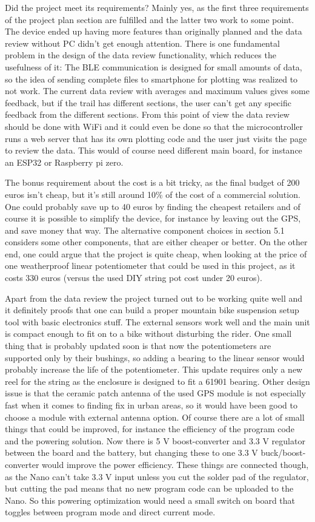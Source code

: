 \documentclass[a4paper,11pt]{article}
\begin{document}
Did the project meet its requirements? Mainly yes, as the first three requirements of the project plan section are fulfilled and the latter two work to some point. The device ended up having more features than originally planned and the data review without PC didn't get enough attention. There is one fundamental problem in the design of the data review functionality, which reduces the usefulness of it: The BLE communication is designed for small amounts of data, so the idea of sending complete files to smartphone for plotting was realized to not work. The current data review with averages and maximum values gives some feedback, but if the trail has different sections, the user can't get any specific feedback from the different sections. From this point of view the data review should be done with WiFi and it could even be done so that the microcontroller runs a web server that has its own plotting code and the user just visits the page to review the data. This would of course need different main board, for instance an ESP32 or Raspberry pi zero.

The bonus requirement about the cost is a bit tricky, as the final budget of 200 euros isn't cheap, but it's still around 10\% of the cost of a commercial solution. One could probably save up to 40 euros by finding the cheapest retailers and of course it is possible to simplify the device, for instance by leaving out the GPS, and save money that way. The alternative component choices in section 5.1 considers some other components, that are either cheaper or better. On the other end, one could argue that the project is quite cheap, when looking at the price of one weatherproof linear potentiometer that could be used in this project, as it costs 330 euros (versus the used DIY string pot cost under 20 euros).

Apart from the data review the project turned out to be working quite well and it definitely proofs that one can build a proper mountain bike suspension setup tool with basic electronics stuff. The external sensors work well and the main unit is compact enough to fit on to a bike without disturbing the rider. One small thing that is probably updated soon is that now the potentiometers are supported only by their bushings, so adding a bearing to the linear sensor would probably increase the life of the potentiometer. This update requires only a new reel for the string as the enclosure is designed to fit a 61901 bearing. Other design issue is that the ceramic patch antenna of the used GPS module is not especially fast when it comes to finding fix in urban areas, so it would have been good to choose a module with external antenna option. Of course there are a lot of small things that could be improved, for instance the efficiency of the program code and the powering solution. Now there is 5 V boost-converter and 3.3 V regulator between the board and the battery, but changing these to one 3.3 V buck/boost-converter would improve the power efficiency. These things are connected though, as the Nano can't take 3.3 V input unless you cut the solder pad of the regulator, but cutting the pad means that no new program code can be uploaded to the Nano. So this powering optimization would need a small switch on board that toggles between program mode and direct current mode.
\end{document}
